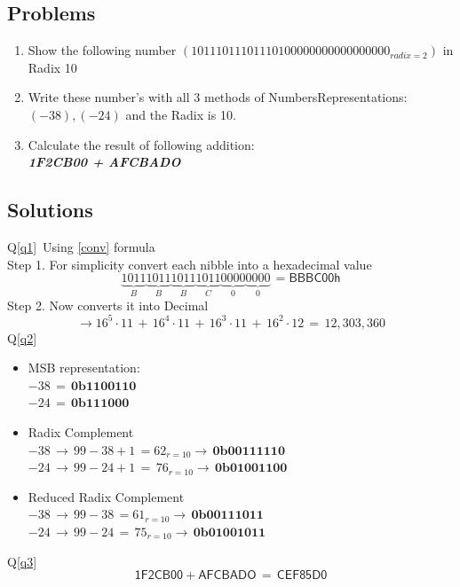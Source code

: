 \subsection{Problems}
\begin{enumerate}
	\item  Show the following number \label{q1} \(\left(1011 1011 1011 1010 0000  0000 0000 0000_{radix=2}\right)\) in Radix 10
	\item Write these number's with all 3 methods of Numbers\linebreak Representations: \((-38),\left(-24\right)\) and the Radix is 10.\label{q2}
	\item Calculate the result of following addition:\\
	\textbf{\textit{1F2CB00 + AFCBADO}}\label{q3}
\end{enumerate}
\subsection{Solutions}
Q\ref{q1}\, Using \eqref{conv} formula \\ 
Step 1. For simplicity convert each nibble into a hexadecimal value
\[
	\underbrace{1011}_{B}\underbrace{1011}_{B}\underbrace{1011}_{B}\underbrace{1011}_{C}\underbrace{0000}_{0}\underbrace{0000}_{0}\,=\mathsf{BBBC00h}
\]
Step 2. Now converts it into Decimal
\[
	\rightarrow 16^{5}\cdot11\,+\,16^{4}\cdot11\,+\,16^{3}\cdot11\,+\,16^{2}\cdot12\,=\,12,303,360
\]
Q\ref{q2} \begin{itemize}
	\item MSB representation: \\
	\(-38\,=\,\mathbf{0b1100110}\)\\
	\(-24\,=\,\mathbf{0b111000}\)
	\item Radix Complement \\
	\(-38\,\rightarrow\,99-38+1\,=62_{r=10}\rightarrow\,\mathbf{0b0011 1110}\)\\
	\(-24\,\rightarrow\,99-24+1\,=\,76_{r=10}\rightarrow\,\mathbf{0b0100 1100}\)\\
	\item Reduced Radix Complement\\
	\(-38\,\rightarrow\,99-38\,=61_{r=10}\rightarrow\,\mathbf{0b0011 1011}\)\\
	\(-24\,\rightarrow\,99-24\,=\,75_{r=10}\rightarrow\,\mathbf{0b0100 1011}\)\\
\end{itemize}
Q\ref{q3}
\[
\mathsf{1F2CB00 + AFCBADO\,=\,CEF85D0}
\]

